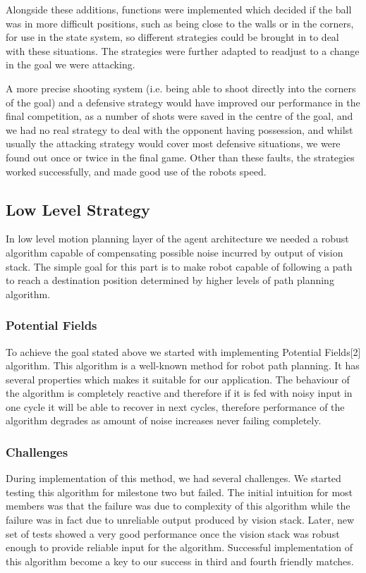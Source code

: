 Alongside these additions, functions were implemented which decided if the ball was in more difficult positions, such as being close to the walls or in the corners, for use in the state system, so different strategies could be brought in to deal with these situations. The strategies were further adapted to readjust to a change in the goal we were attacking. 

A more precise shooting system (i.e. being able to shoot directly into the corners of the goal) and a defensive strategy would have improved our performance in the final competition, as a number of shots were saved in the centre of the goal, and we had no real strategy to deal with the opponent having possession, and whilst usually the attacking strategy would cover most defensive situations, we were found out once or twice in the final game. Other than these faults, the strategies worked successfully, and made good use of the robots speed.

\subsection{Low Level Strategy}
In low level motion planning layer of the agent architecture we needed a robust algorithm capable of compensating possible noise incurred by output of vision stack.  The simple goal for this part is to make robot capable of following a path to reach a destination position determined by higher levels of path planning algorithm.\linebreak

\subsubsection{Potential Fields}
To achieve the goal stated above we started with implementing Potential Fields[2] algorithm. This algorithm is a well-known method for robot path planning. It has several properties which makes it suitable for our application. The behaviour of the algorithm is completely reactive and therefore if it is fed with noisy input in one cycle it will be able to recover in next cycles, therefore performance of the algorithm degrades as amount of noise increases never failing completely.\linebreak

\subsubsection{Challenges}
During implementation of this method, we had several challenges. We started testing this algorithm for milestone two but failed. The initial intuition for most members was that the failure was due to complexity of this algorithm while the failure was in fact due to unreliable output produced by vision stack. Later, new set of tests showed a very good performance once the vision stack was robust enough to provide reliable input for the algorithm. Successful implementation of this algorithm become a key to our success in third and fourth friendly matches.\linebreak

